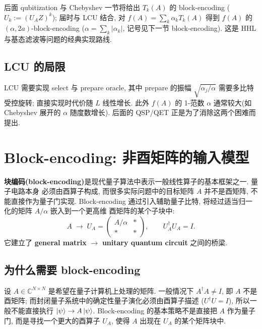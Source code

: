\documentclass[utf8]{article} %
\numberwithin{equation}{section}   %
\newtheorem{Note}{\hskip 2em {\color{red} 注}}[subsection]
\newtheorem{Eg}{\hskip 2em {\color{black} 例}}[subsection]
\begin{document}
\begin{Eg}
    后面 qubitization 与 Chebyshev 一节将给出 $T_k(A)$ 的 block-encoding
    ($U_k := (U_A Z)^k$); 届时与 LCU 结合,
    对 $f(A) = \sum_k \alpha_k T_k(A)$ 得到 $f(A)$ 的 $(\alpha, 2a)$-block-encoding
    ($\alpha = \sum_k |\alpha_k|$, 记号见下一节 block-encoding).
    这是 HHL 与基态滤波等问题的经典实现路线.
\end{Eg}

\subsection{LCU 的局限}

\begin{Note}
    LCU 需要实现 select 与 prepare oracle, 其中 prepare 的振幅 $\sqrt{\alpha_j/\alpha}$
    需要多比特受控旋转; 直接实现时代价随 $L$ 线性增长. 此外 $f(A)$ 的
    1-范数 $\alpha$ 通常较大(如 Chebyshev 展开的 $\alpha$ 随度数增长).
    后面的 QSP/QET 正是为了消除这两个困难而提出.
\end{Note}

\section{Block-encoding: 非酉矩阵的输入模型}

\textbf{块编码(block-encoding)}是现代量子算法中表示一般线性算子的基本框架之一. 量子电路本身
必须由酉算子构成, 而很多实际问题中的目标矩阵 $A$ 并不是酉矩阵, 不能直接作为量子门实现.
Block-encoding 通过引入辅助量子比特, 将经过适当归一化的矩阵 $A/\alpha$ 嵌入到一个更高维
酉矩阵的某个子块中:
\begin{equation}
    A \;\longrightarrow\; U_A = \begin{pmatrix} A/\alpha & \ast \\ \ast & \ast \end{pmatrix},
    \qquad U_A^\dagger U_A = I.
\end{equation}
它建立了 \textbf{general matrix} $\longrightarrow$ \textbf{unitary quantum circuit} 之间的桥梁.

\subsection{为什么需要 block-encoding}

设 $A \in \mathbb{C}^{N \times N}$ 是希望在量子计算机上处理的矩阵. 一般情况下
$A^\dagger A \ne I$, 即 $A$ 不是酉矩阵; 而封闭量子系统中的确定性量子演化必须由酉算子描述
($U^\dagger U = I$), 所以一般不能直接执行 $\ket{\psi} \to A\ket{\psi}$.
Block-encoding 的基本策略不是直接把 $A$ 作为量子门, 而是寻找一个更大的酉算子 $U_A$,
使得 $A$ 出现在 $U_A$ 的某个矩阵块中.
\end{document}
